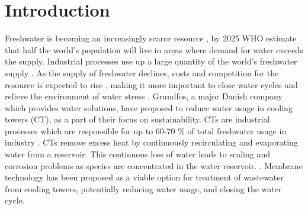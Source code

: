 \chapter{Introduction}



Freshwater is becoming an increasingly scarce resource %
, by 2025 WHO estimate that half the world's population will live in areas where demand for water exceeds the supply. \citep{WHO2017} 
Industrial processes use up a large quantity of the world's freshwater supply  \citep{koemanMembraneDistillationIndustrial2016}. 
As the supply of freshwater declines, costs and competition for the resource is expected to rise \citep{altmanMembraneTreatmentSidestream2012}, making it more important to close water cycles and relieve the environment of water stress \citep{koemanMembraneDistillationIndustrial2016}.
Grundfos, a major Danish company which provides water solutions, have proposed to reduce water usage in cooling towers (CT), as a part of their focus on sustainability. 
CTs are industrial processes which are responsible for up to 60-70 \% of total freshwater usage in industry \citep{koemanMembraneDistillationIndustrial2016} \citep{farahanniRecoveryCoolingTower_2016}. 
CTs remove excess heat by continuously recirculating and evaporating water from a reservoir. 
This continuous loss of water leads to scaling and corrosion problems as species are concentrated in the water reservoir.
\citep{PlantEngineerBookReference2001}. 
Membrane technology has been proposed as a viable option for treatment of wastewater from cooling towers, potentially reducing water usage, and closing the water cycle. \citep{kaliappan_RecoveryReuseWater_2005}





